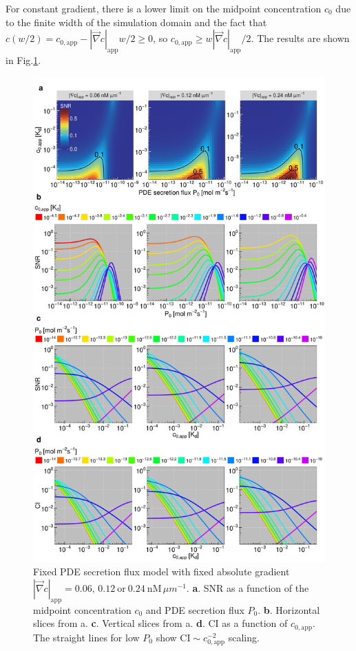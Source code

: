 \documentclass[10pt]{article}
\begin{document}
For constant gradient, there is a lower limit on the midpoint concentration $c_0$ due to the finite width of the simulation domain and the fact that $c(w/2) = c_{0, \mathrm{app}} - |\vec{\nabla}c|_{\mathrm{app}}w/2 \geq 0$, so $c_{0, \mathrm{app}} \geq w|\vec{\nabla} c|_{\mathrm{app}}/2$. The results are shown in Fig.\ref{sifig:fixed_dcdx}.

\begin{figure}[!ht]
	\centering
	\includegraphics[scale=0.25]{../figures/si_pde_flux_fixed_dcdx_snr_plots}
	\caption{
	Fixed PDE secretion flux model with fixed absolute gradient $|\vec{\nabla}c|_{\mathrm{app}} = 0.06,\,0.12\:\mathrm{or}\:0.24\:\mathrm{nM}\,\mu m^{-1}$. 
	\textbf{a}. SNR as a function of the midpoint concentration $c_0$ and PDE secretion flux $P_0$.
	\textbf{b}. Horizontal slices from a.
	\textbf{c}. Vertical slices from a.
	\textbf{d}. CI as a function of $c_{0,\mathrm{app}}$. The straight lines for low $P_0$ show $\mathrm{CI} \sim c_{0,\mathrm{app}}^{-2}$ scaling.
	}
	\label{sifig:fixed_dcdx}
\end{figure}
\end{document}
